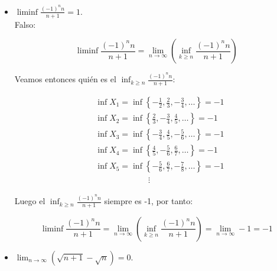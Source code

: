 \begin{itemize}[leftmargin=*]
\begin{proof}
    Note que si $n$ es par entonces:

    $$\lim _{n \rightarrow \infty}\left(\sup_{k \geq n} \frac{(-1)^n}{n}\right)=\lim_{n \to \infty} \frac{1}{n}=0$$

    Si $n$ es impar:

    $$\lim _{n \rightarrow \infty}\left(\sup _{k \geq n} \frac{(-1)^n}{n}\right)=\lim_{n \to \infty} \frac{1}{2n+1}=0$$
    
    No es necesario probar este límite ya que probamos el caso general $\frac{1}{n}$ da 0.

    \end{proof} 


    \item  $\liminf \frac{(-1)^n n}{n+1}=1$.\\
 
 Falso: 

        $$\liminf \frac{(-1)^n n}{n+1}=\lim _{n \rightarrow \infty}\left(\inf_{k \geq n} \frac{(-1)^nn}{n+1}\right)$$

        Veamos entonces quién es el $\inf_{k\geq n} \frac{(-1)^nn}{n+1}$:

        \begin{align*}
            &\inf X_1=\inf \left\{-\frac{1}{2},\frac{2}{3},-\frac{3}{4},\ldots\right\}=-1\\
            &\inf X_2=\inf \left\{\frac{2}{3},-\frac{3}{4},\frac{4}{5},\ldots\right\}=-1\\
            &\inf X_3=\inf \left\{-\frac{3}{4},\frac{4}{5},-\frac{5}{6},\ldots\right\}=-1\\
            &\inf X_4=\inf \left\{\frac{4}{5},-\frac{5}{6},\frac{6}{7},\ldots\right\}=-1\\
            &\inf X_5=\inf \left\{-\frac{5}{6},\frac{6}{7},-\frac{7}{8},\ldots\right\}=-1\\
            & \mathrel{\phantom{=askaldfjasl}}\vdots
        \end{align*}

        Luego el $\inf_{k\geq n} \frac{(-1)^nn}{n+1}$ siempre es -1, por tanto:

        $$\liminf \frac{(-1)^n n}{n+1}=\lim _{n \rightarrow \infty}\left(\inf_{k \geq n} \frac{(-1)^nn}{n+1}\right)=\lim_{n \to \infty} -1=-1$$




    \item $\lim _{n \rightarrow \infty}(\sqrt{n+1}-\sqrt{n})=0$.\\
 

\end{itemize}

